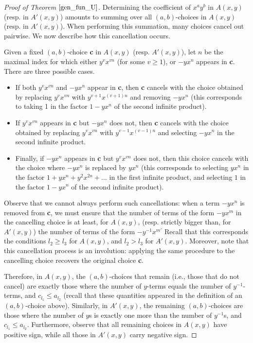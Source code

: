 \documentclass[a4paper, 12pt, oneside]{amsart}
\theoremstyle{definition}
\begin{document}
\begin{proof}[Proof of Theorem $\ref{gen_fun_U}$]
Determining the coefficient of $x^ay^b$ in $A(x,y)$ (resp. in $A'(x,y)$) amounts to summing over all $(a,b)$-choices in $A(x,y)$ (resp. in $A'(x,y)$). 
When performing this summation, many choices cancel out pairwise. We now describe how this cancellation occurs.

Given a fixed $(a,b)$-choice \textbf{c} in $A(x,y)$ (resp. $A'(x,y)$), let $n$ be the maximal index for which either $y^{v}x^{vn}$ (for some $v \ge 1$), or $-yx^n$ appears in \textbf{c}. There are three possible cases.
\begin{itemize}
    \item If both $y^{v}x^{vn}$ and $-yx^n$ appear in \textbf{c}, then \textbf{c} cancels with the choice obtained by replacing $y^{v}x^{vn}$ with $y^{v+1}x^{(v+1)n}$ and removing $-yx^n$  (this corresponds to taking 1 in the factor $1-yx^n$ of the second infinite product).
    \item If $y^vx^{vn}$ appears in \textbf{c} but $-yx^n$ does not, then \textbf{c} cancels with the choice obtained by replacing $y^vx^{vn}$ with $y^{v-1}x^{(v-1)n}$ and selecting $-yx^n$ in the second infinite product.
    \item Finally, if $-yx^n$ appears in \textbf{c} but $y^vx^{vn}$ does not, then this choice cancels with the choice where $-yx^n$ is replaced by $yx^n$ (this corresponds to selecting $yx^n$ in the factor $1+yx^n+y^2x^{2n}+\dots$ in the first infinite product, and selecting $1$ in the factor $1-yx^n$ of the second infinite product).
\end{itemize}

Observe that we cannot always perform such cancellations: when a term $-yx^n$ is removed from \textbf{c}, we must ensure that the number of terms of the form $-yx^m$ in the cancelling choice is at least, for $A(x,y)$, (resp. strictly bigger than, for $A'(x,y)$) the number of terms of the form $-y^{-1}x^{m'}$ Recall that this corresponds the conditions $l_2 \ge l_3$ for $A(x,y)$, and $l_2 > l_3$ for $A'(x,y)$.
Moreover, note that this cancellation process is an involution: applying the same procedure to the cancelling choice recovers the original choice \textbf{c}.

Therefore, in $A(x,y)$, the $(a,b)$-choices that remain (i.e., those that do not cancel) are exactly those where the number of $y$-terms equals the number of $y^{-1}$-terms, and $c_{l_1} \le a_{l_2}$ (recall that these quantities appeared in the definition of an $(a,b)$-choice above). Similarly, in $A'(x,y)$, the remaining $(a,b)$-choices are those where the number of $y$s is exactly one more than the number of $y^{-1}$s, and $c_{l_1} \le a_{l_2}$. Furthermore, observe that all remaining choices in $A(x,y)$ have positive sign, while all those in $A'(x,y)$ carry negative sign.



\end{proof}
\end{document}
